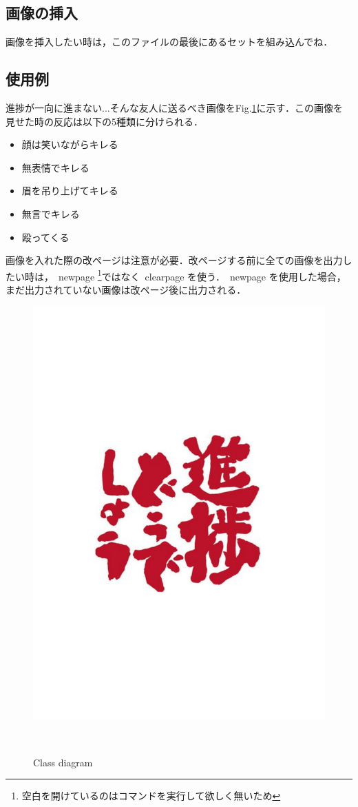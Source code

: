 \subsection{画像の挿入}
画像を挿入したい時は，このファイルの最後にあるセットを組み込んでね．

\subsection{使用例}
進捗が一向に進まない...そんな友人に送るべき画像をFig.\ref{fig:class}に示す．この画像を見せた時の反応は以下の5種類に分けられる．

\begin{itemize}
 \item 顔は笑いながらキレる
 \item 無表情でキレる
 \item 眉を吊り上げてキレる
 \item 無言でキレる
 \item 殴ってくる
\end{itemize}

画像を入れた際の改ページは注意が必要．改ページする前に全ての画像を出力したい時は，\ newpage \footnote{空白を開けているのはコマンドを実行して欲しく無いため}ではなく\ clearpage を使う．\ newpage を使用した場合，まだ出力されていない画像は改ページ後に出力される．

\begin{figure}[tb]
\centering
\includegraphics[width=12cm]{fig/class.pdf} %
\caption{Class diagram}　%
\label{fig:class} %
\end{figure}